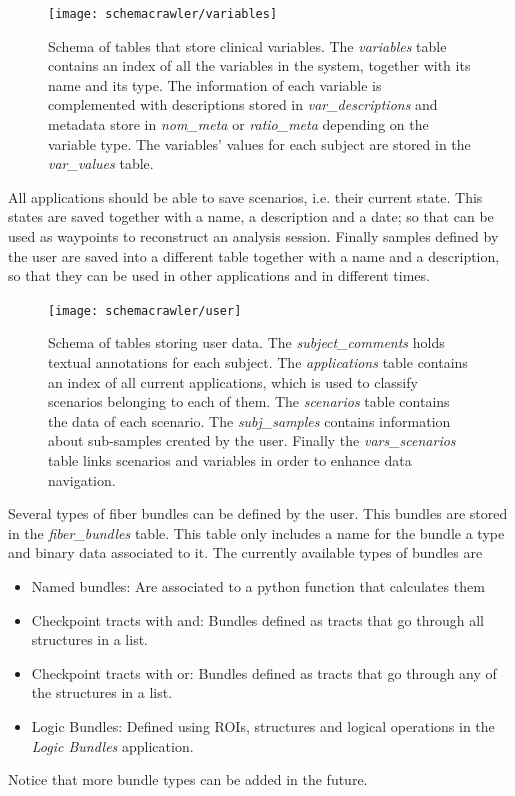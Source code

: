 \begin{figure}
\centering
\texttt{[image: schemacrawler/variables]}%
\caption{\label{fig_db_variables}Schema of tables that store clinical variables. The \emph{variables} table contains an index of all the variables in the system, together with its name and its type. The information of each variable is complemented with descriptions stored in \emph{var\_descriptions} and metadata store in \emph{nom\_meta} or \emph{ratio\_meta} depending on the variable type. The variables' values for each subject are stored in the \emph{var\_values} table.}
\end{figure}

All applications should be able to save scenarios, i.e. their current state. This states are saved together with a name, a description and a date; so that can be used as waypoints to reconstruct an analysis session. Finally samples defined by the user are saved into a different table together with a name and a description, so that they can be used in other applications and in different times.

\begin{figure}
\centering
\texttt{[image: schemacrawler/user]}%
\caption{\label{fig_db_user}Schema of tables storing user data. The \emph{subject\_comments} holds textual annotations for each subject. The \emph{applications} table contains an index of all current applications, which is used to classify scenarios belonging to each of them. The \emph{scenarios} table contains the data of each scenario. The \emph{subj\_samples} contains information about sub-samples created by the user. Finally the \emph{vars\_scenarios} table links scenarios and variables in order to enhance data navigation.}
\end{figure}

Several types of fiber bundles can be defined by the user. This bundles are stored in the \emph{fiber\_bundles} table. This table only includes a name for the bundle a type and binary data associated to it. The currently available types of bundles are 
\begin{itemize}
\item Named bundles: Are associated to a python function that calculates them
\item Checkpoint tracts with and: Bundles defined as tracts that go through all structures in a list.
\item Checkpoint tracts with or: Bundles defined as tracts that go through any of the structures in a list.
\item Logic Bundles: Defined using ROIs, structures and logical operations in the \emph{Logic Bundles} application.
\end{itemize}
Notice that more bundle types can be added in the future.


